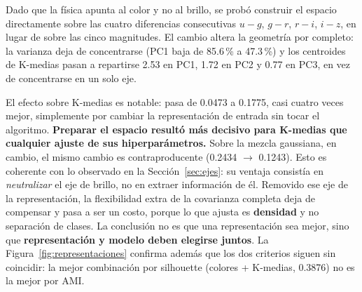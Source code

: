 \documentclass[10pt,journal]{IEEEtran}
\begin{document}
  Dado que la f\'isica apunta al color y no al brillo, se prob\'o construir el espacio directamente sobre las cuatro diferencias consecutivas $u-g$, $g-r$, $r-i$, $i-z$, en lugar de sobre las cinco magnitudes. El cambio altera la geometr\'ia por completo: la varianza deja de concentrarse (PC1 baja de 85.6\,\% a 47.3\,\%) y los centroides de K-medias pasan a repartirse 2.53 en PC1, 1.72 en PC2 y 0.77 en PC3, en vez de concentrarse en un solo eje.

  \begin{table}[H]
    \caption{Comparaci\'on de representaciones y modelos ($k=3$, tres componentes)}
    \label{tab:representaciones}
    \centering
  \end{table}

  El efecto sobre K-medias es notable: pasa de 0.0473 a 0.1775, casi cuatro veces mejor, simplemente por cambiar la representaci\'on de entrada sin tocar el algoritmo. \textbf{Preparar el espacio result\'o m\'as decisivo para K-medias que cualquier ajuste de sus hiperpar\'ametros.} Sobre la mezcla gaussiana, en cambio, el mismo cambio es contraproducente (0.2434 $\to$ 0.1243). Esto es coherente con lo observado en la Secci\'on~\ref{sec:ejes}: su ventaja consist\'ia en \emph{neutralizar} el eje de brillo, no en extraer informaci\'on de \'el. Removido ese eje de la representaci\'on, la flexibilidad extra de la covarianza completa deja de compensar y pasa a ser un costo, porque lo que ajusta es \textbf{densidad} y no separaci\'on de clases. La conclusi\'on no es que una representaci\'on sea mejor, sino que \textbf{representaci\'on y modelo deben elegirse juntos}. La Figura~\ref{fig:representaciones} confirma adem\'as que los dos criterios siguen sin coincidir: la mejor combinaci\'on por silhouette (colores + K-medias, 0.3876) no es la mejor por AMI.
\end{document}
